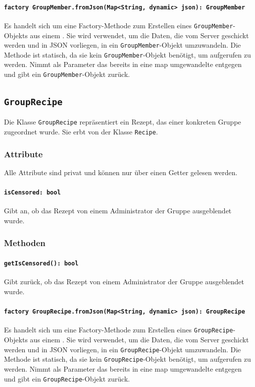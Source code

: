 \documentclass{entwurfsheft}
\begin{document}
\paragraph{\texttt{factory GroupMember.fromJson(Map<String, dynamic> json): GroupMember}} Es handelt sich um eine Factory-Methode zum Erstellen eines \texttt{GroupMember}-Objekts aus einem . Sie wird verwendet, um die Daten, die vom Server geschickt werden und in \Gls{JSON} vorliegen, in ein \texttt{GroupMember}-Objekt umzuwandeln. Die Methode ist statisch, da sie kein \texttt{GroupMember}-Objekt benötigt, um aufgerufen zu werden. Nimmt als Parameter das bereits in eine \Gls{map} umgewandelte  entgegen und gibt ein \texttt{GroupMember}-Objekt zurück.
\newpage
\subsection{\texttt{GroupRecipe}}\label{sec:GroupRecipe}
Die Klasse \texttt{GroupRecipe} repräsentiert ein Rezept, das einer konkreten Gruppe zugeordnet wurde. Sie erbt von der Klasse \texttt{Recipe}.
\subsubsection*{Attribute}
Alle Attribute sind privat und können nur über einen Getter gelesen werden.
\paragraph{\texttt{isCensored: bool}}
Gibt an, ob das Rezept von einem Administrator der Gruppe ausgeblendet wurde.
\subsubsection*{Methoden}
\paragraph{\texttt{getIsCensored(): bool}}
Gibt zurück, ob das Rezept von einem Administrator der Gruppe ausgeblendet wurde.
\paragraph{\texttt{factory GroupRecipe.fromJson(Map<String, dynamic> json): GroupRecipe}} Es handelt sich um eine Factory-Methode zum Erstellen eines \texttt{GroupRecipe}-Objekts aus einem . Sie wird verwendet, um die Daten, die vom Server geschickt werden und in \Gls{JSON} vorliegen, in ein \texttt{GroupRecipe}-Objekt umzuwandeln. Die Methode ist statisch, da sie kein \texttt{GroupRecipe}-Objekt benötigt, um aufgerufen zu werden. Nimmt als Parameter das bereits in eine \Gls{map} umgewandelte  entgegen und gibt ein \texttt{GroupRecipe}-Objekt zurück.
\end{document}
